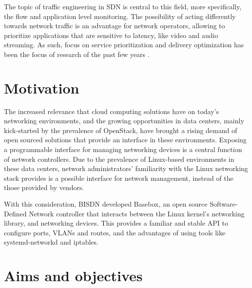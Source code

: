 \par The topic of traffic engineering in SDN is central to this field, more specifically, the flow and application level monitoring.  The possibility of acting
differently towards network traffic is an advantage for network operators, allowing to prioritize applications that are
sensitive to latency, like video and audio streaming. As such, focus on service prioritization and delivery optimization has been the focus of research 
of the past few years \cite{bakhshi_user-centric_2017}.

\section {Motivation}


The increased relevance that cloud computing solutions have on today's networking environments, and the growing opportunities in data centers, mainly
kick-started by the prevalence of OpenStack, have brought a rising demand of open sourced solutions that provide an interface in these environments. Exposing
a programmable interface for managing networking devices is a central function of network controllers. Due to the prevalence of Linux-based environments in these
data centers, network administrators' familiarity with the Linux networking stack provides is a possible interface for network management, instead of the those
provided by vendors.

\par With this consideration, BISDN developed Basebox, an open source Software-Defined Network controller that interacts between the Linux kernel's networking
library, and networking devices. This provides a familiar and stable API to configure ports, VLANs and routes, and the advantages of using tools like 
systemd-networkd and iptables.

\section {Aims and objectives}


